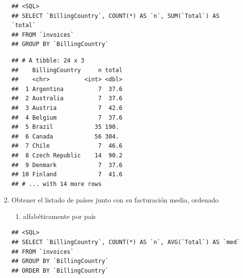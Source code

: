 \documentclass[
]{book}
\newenvironment{Shaded}{\begin{snugshade}}{\end{snugshade}}
\newcommand{\DataTypeTok}[1]{\textcolor[rgb]{0.13,0.29,0.53}{#1}}
\newcommand{\KeywordTok}[1]{\textcolor[rgb]{0.13,0.29,0.53}{\textbf{#1}}}
\newcommand{\NormalTok}[1]{#1}
\newcommand{\OperatorTok}[1]{\textcolor[rgb]{0.81,0.36,0.00}{\textbf{#1}}}
\newcommand{\OtherTok}[1]{\textcolor[rgb]{0.56,0.35,0.01}{#1}}
\newcommand{\StringTok}[1]{\textcolor[rgb]{0.31,0.60,0.02}{#1}}
\providecommand{\tightlist}{%
  \setlength{\itemsep}{0pt}\setlength{\parskip}{0pt}}
\begin{document}
\begin{enumerate}
\begin{verbatim}
## <SQL>
## SELECT `BillingCountry`, COUNT(*) AS `n`, SUM(`Total`) AS `total`
## FROM `invoices`
## GROUP BY `BillingCountry`
\end{verbatim}

\begin{Shaded}
\end{Shaded}

\begin{verbatim}
## # A tibble: 24 x 3
##    BillingCountry     n total
##    <chr>          <int> <dbl>
##  1 Argentina          7  37.6
##  2 Australia          7  37.6
##  3 Austria            7  42.6
##  4 Belgium            7  37.6
##  5 Brazil            35 190. 
##  6 Canada            56 304. 
##  7 Chile              7  46.6
##  8 Czech Republic    14  90.2
##  9 Denmark            7  37.6
## 10 Finland            7  41.6
## # ... with 14 more rows
\end{verbatim}
\item
  Obtener el listado de países junto con su facturación media, ordenado

  \begin{enumerate}
  \def\labelenumii{(\alph{enumii})}
  \tightlist
  \item
    alfabéticamente por país
  \end{enumerate}

\begin{Shaded}
\end{Shaded}

\begin{verbatim}
## <SQL>
## SELECT `BillingCountry`, COUNT(*) AS `n`, AVG(`Total`) AS `med`
## FROM `invoices`
## GROUP BY `BillingCountry`
## ORDER BY `BillingCountry`
\end{verbatim}


\end{enumerate}
\end{document}

